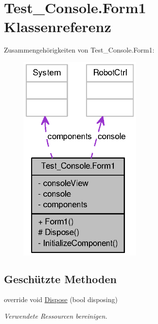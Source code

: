 \hypertarget{class_test___console_1_1_form1}{
\section{Test\_\-Console.Form1 Klassenreferenz}
\label{class_test___console_1_1_form1}
}


Zusammengehörigkeiten von Test\_\-Console.Form1:\nopagebreak
\begin{figure}[H]
\begin{center}
\leavevmode
\includegraphics[width=174pt]{class_test___console_1_1_form1__coll__graph}
\end{center}
\end{figure}
\subsection*{Geschützte Methoden}
\begin{DoxyCompactItemize}
\item 
override void \hyperlink{class_test___console_1_1_form1_a7fb762691a68d8aca1928a20ab2ebe77}{Dispose} (bool disposing)
\begin{DoxyCompactList}\small\item\em Verwendete Ressourcen bereinigen. \item\end{DoxyCompactList}\end{DoxyCompactItemize}


